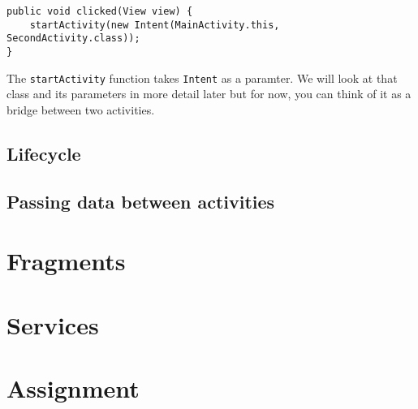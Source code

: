 \begin{lstlisting}[style=A_Java]
public void clicked(View view) {
    startActivity(new Intent(MainActivity.this, SecondActivity.class));
}	
\end{lstlisting}

The \texttt{startActivity} function takes \texttt{Intent} as a paramter. We will look at that class and its parameters in more detail later but for now, you can think of it as a bridge between two activities. 

\subsection{Lifecycle}

\subsection{Passing data between activities}




\section{Fragments}
\section{Services}

\section{Assignment}